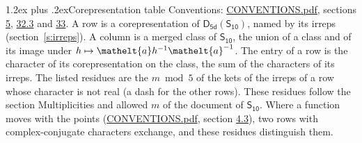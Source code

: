 \documentclass[10pt,a4paper]{article}
\makeatletter
\renewcommand\section{\@startsection{section}{1}{\z@}{-3ex plus -1ex minus -.2ex}%
  {1.2ex plus .2ex}{\normalfont\large\sffamily\bfseries\color{parttitle}}}
\numberwithin{equation}{section}
\newcommand{\eltfont}[1]{{\let\sigma\eltsigma\mathelt{#1}}}
\newcommand{\grp}[1]{\mathsf{#1}}
\newcommand{\elt}[1]{\eltfont{#1}}
\makeatother
\begin{document}
\section{Corepresentation table}\label{s:character_table}
Conventions: \href{../../CONVENTIONS.pdf}{CONVENTIONS.pdf}, sections \href{../../../rotation/CONVENTIONS.pdf\#conv.5}{5}, \href{../../CONVENTIONS.pdf\#conv.32.3}{32.3} and \href{../../CONVENTIONS.pdf\#conv.33}{33}.
A row is a corepresentation of $\grp{D_{5d}}(\grp{S_{10}})$, named by its irreps (section~\ref{s:irreps}). A column is a merged class of $\grp{S_{10}}$, the union of a class and of its image under $h \mapsto \elt{a} h^{-1} \elt{a}^{-1}$. The entry of a row is the character of its corepresentation on the class, the sum of the characters of its irreps.
\leavevmode\label{n:head.parity}The listed residues are the $m \bmod 5$ of the kets of the irreps of a row whose character is not real (a dash for the other rows). These residues follow the section Multiplicities and allowed $m$ of the document of \href{../../../rotation/data/pdf/S10.pdf}{$\grp{S_{10}}$}. Where a function moves with the points (\href{../../CONVENTIONS.pdf}{CONVENTIONS.pdf}, section \href{../../../rotation/CONVENTIONS.pdf\#conv.4.3}{4.3}), two rows with complex-conjugate characters exchange, and these residues distinguish them.
\end{document}
